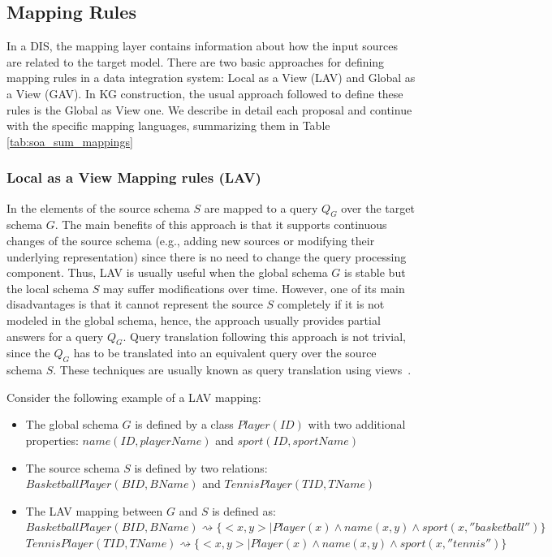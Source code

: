 \subsection{Mapping Rules}
In a DIS, the mapping layer contains information about how the input sources are related to the target model. There are two basic approaches for defining mapping rules in a data integration system: Local as a View (LAV) and Global as a View (GAV). In KG construction, the usual approach followed to define these rules is the Global as View one. We describe in detail each proposal and continue with the specific mapping languages, summarizing them in Table \ref{tab:soa_sum_mappings}

\subsubsection{Local as a View Mapping rules (LAV)}
In \citep{ullman1997information} the elements of the source schema $S$ are mapped  to a query $Q_G$ over the target schema $G$. The main benefits of this approach is that it supports continuous changes of the source schema (e.g., adding new sources or modifying their underlying representation) since there is no need to change the query processing component. Thus, LAV is usually useful when the global schema $G$ is stable but the local schema $S$ may suffer modifications over time. However, one of its main disadvantages is that it cannot represent the source $S$ completely if it is not modeled in the global schema, hence, the approach usually provides partial answers for a query $Q_G$. Query translation following this approach is not trivial, since the $Q_G$ has to be translated into an equivalent query over the source schema $S$. These techniques are usually known as query translation using views~\citep{halevy2001answering}.

Consider the following example of a LAV mapping:
\begin{itemize}
    \item The global schema $G$ is defined by a class $Player(ID)$ with two additional properties: $name(ID, playerName)$ and $sport(ID,sportName)$
    \item The source schema $S$ is defined by two relations: $BasketballPlayer (BID, BName)$ and $TennisPlayer (TID, TName)$
    \item The LAV mapping between $G$ and $S$ is defined as:\\
    $BasketballPlayer(BID,BName) \rightsquigarrow \{<x,y>|Player(x)\wedge name(x,y) \wedge sport(x,''basketball'')\}$\\
    $TennisPlayer(TID,TName) \rightsquigarrow \{<x,y>|Player(x)\wedge name(x,y) \wedge sport(x,''tennis'')\}$
\end{itemize}

